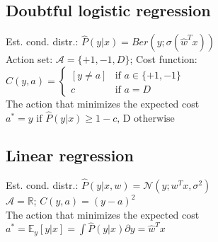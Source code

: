 
\subsection*{Doubtful logistic regression}
	 Est. cond. distr.: $\hat{P}(y|x) = Ber(y;\sigma(\hat{w}^Tx))$\\
	 Action set: $\mathcal{A} = \{ +1, -1, D\}$;  Cost function:\\
	 $C(y,a) = \begin{cases}
			[y \neq a] &\text{if } a \in \{+1,-1\}\\
			c &\text{if } a = D
       \end{cases}$\\
The action that minimizes the expected cost\\
$a^* = y \text{ if } \hat{P}(y|x) \geq 1-c\text{, D otherwise}$

\subsection*{Linear regression}
	 Est. cond. distr.: $\hat{P}(y|x,w) = \mathcal{N}(y;w^Tx, \sigma^2)$\\
 $\mathcal{A} = \mathbb{R}$; $C(y,a) = (y-a)^2$\\
The action that minimizes the expected cost\\
$a^* = \mathbb{E}_y[y|x] = \int \hat{P}(y | x) \partial y = \hat{w}^Tx$

